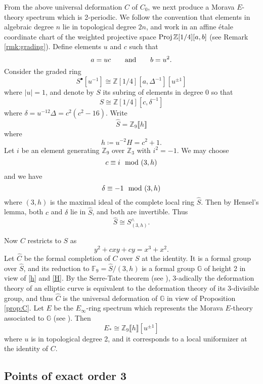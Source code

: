 \documentclass{gtpart}
\theoremstyle{definition}
\theoremstyle{remark}
\newcommand{\mb}[1]{\mathbb{#1}}
\newcommand{\Proj}{{\rm Proj\thinspace}}
\newcommand{\BF}{{\mb F}}
\newcommand{\BG}{{\mb G}}
\newcommand{\BZ}{{\mb Z}}
\newcommand{\HC}{\widehat{C}}
\newcommand{\HS}{\widehat{S}}
\newcommand{\md}{~~{\rm mod}~}
\newcommand{\ad}{{\rm and}}
\newcommand{\s}{S^\bullet}
\begin{document}
From the above universal deformation $C$ of $C_0$, we next produce a 
Morava $E$-theory spectrum which is 2-periodic.  We follow the 
convention that elements in algebraic degree $n$ lie in topological 
degree $2n$, and work in an affine \'etale coordinate chart of the 
weighted projective space $\Proj \BZ [1/4] [a, b]$ (see Remark 
\ref{rmk:grading}).  Define elements $u$ and $c$ such that 
\[
 a = u c \qquad \ad \qquad b = u^2.  
\]
Consider the graded ring 
\[
 \s [u^{-1}] \cong \BZ [1/4] [a, \Delta^{-1}] [u^{\pm1}] 
\]
where $|u| = 1$, and denote by $S$ its subring of elements in degree 0 
so that 
\begin{equation}
\label{S}
 S \cong \BZ [1/4] [c, \delta^{-1}] 
\end{equation}
where $\delta = u^{-12} \Delta = c^2 (c^2 - 16)$.  Write 
\[
 \HS = \BZ_9 \llbracket h \rrbracket 
\]
where 
\begin{equation}
\label{h}
 h \coloneqq u^{-2} H = c^2 + 1.  
\end{equation}
Let $i$ be an element generating $\BZ_9$ over $\BZ_3$ with $i^2 = -1$.  
We may choose 
\[
 c \equiv i \md (3,h) 
\]
and we have 
\[
 \delta \equiv -1 \md (3,h) 
\]
where $(3,h)$ is the maximal ideal of the complete local ring $\HS$.  
Then by Hensel's lemma, both $c$ and $\delta$ lie in $\HS$, and both are 
invertible.  Thus 
\[
 \HS \cong S_{(3,h)}^\wedge.  
\]

Now $C$ restricts to $S$ as 
\begin{equation}
\label{Cc}
 y^2 + c x y + c y = x^3 + x^2.  
\end{equation}
Let $\HC$ be the formal completion of $C$ over $S$ at the identity.  It 
is a formal group over $\HS$, and its reduction to $\BF_9 = \HS / (3,h)$ 
is a formal group $\BG$ of height 2 in view of \eqref{h} and \eqref{H}.  
By the Serre-Tate theorem (see \cite[2.9.1]{KM}), 3-adically the 
deformation theory of an elliptic curve is equivalent to the deformation 
theory of its 3-divisible group, and thus $\HC$ is the universal 
deformation of $\BG$ in view of Proposition \ref{prop:C}.  Let $E$ be 
the $E_\infty$-ring spectrum which represents the Morava $E$-theory 
associated to $\BG$ (see \cite[Corollary 7.6]{GH}).  Then 
\[
 E_* \cong \BZ_9 \llbracket h \rrbracket [u^{\pm 1}] 
\]
where $u$ is in topological degree 2, and it corresponds to a local 
uniformizer at the identity of $C$.  


\subsection{Points of exact order 3}
\end{document}
